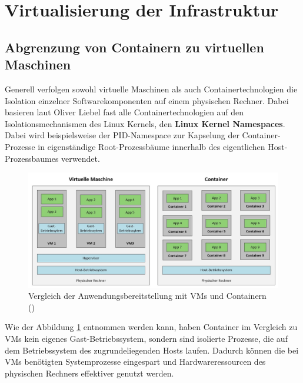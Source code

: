 \section{Virtualisierung der Infrastruktur}
\subsection{Abgrenzung von Containern zu virtuellen Maschinen}
Generell verfolgen sowohl virtuelle Maschinen als auch Containertechnologien die Isolation einzelner Softwarekomponenten auf einem physischen Rechner. \autocite[Vgl.][S. 32-33]{Oggl.2018}
Dabei basieren laut Oliver Liebel fast alle Containertechnologien auf den Isolationsmechanismen des Linux Kernels, den \textbf{Linux Kernel Namespaces}. Dabei wird beispielsweise der PID-Namespace zur Kapselung der Container-Prozesse in eigenständige Root-Prozessbäume innerhalb des eigentlichen Host-Prozessbaumes verwendet.\autocite[Vgl.][S. 80-81]{Liebel.2019}
\\
\begin{figure}[h]
	\begin{center}
		\includegraphics[width=16cm]{img/VM_vs_Container.JPG}
		\caption[Vergleich der Anwendungsbereitstellung mit \acsp{VM} und Containern]{Vergleich der Anwendungsbereitstellung mit \acsp{VM} und Containern\\
			(\cite[Eigene Abbildung in Anlehnung an][S.11]{Luksa.2018})}
		\label{Vergleich_VM_Container}
	\end{center}
\end{figure}
\newpage
Wie der Abbildung \ref{Vergleich_VM_Container} entnommen werden kann, haben Container im Vergleich zu \acsp{VM} kein eigenes Gast-Betriebssystem, sondern sind isolierte Prozesse, die auf dem Betriebssystem des zugrundeliegenden Hosts laufen. Dadurch können die bei \acsp{VM} benötigten Systemprozesse eingespart und Hardwareressourcen des physischen Rechners effektiver genutzt werden.\autocite[Vgl.][S. 10-12]{Luksa.2018}
